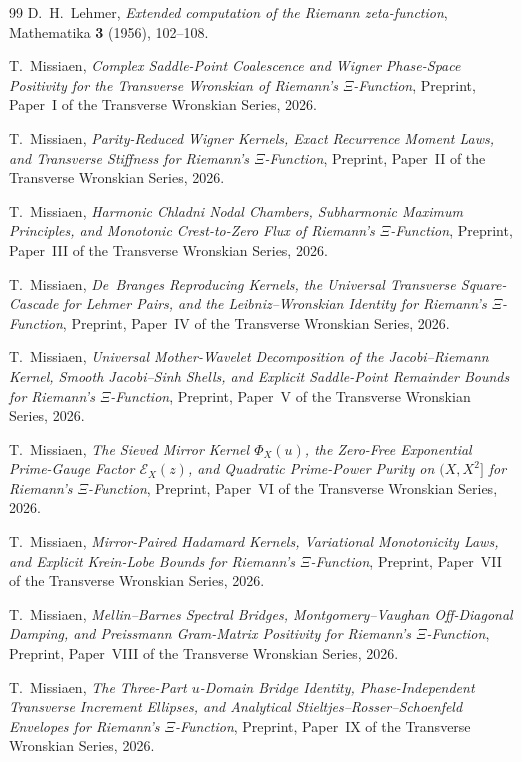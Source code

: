 \documentclass[11pt,reqno]{amsart}
\theoremstyle{definition}
\theoremstyle{remark}
\numberwithin{equation}{section}
\begin{document}
\begin{thebibliography}{99}
D.~H.~Lehmer,
\emph{Extended computation of the Riemann zeta-function},
Mathematika \textbf{3} (1956), 102--108.

T.~Missiaen,
\emph{Complex Saddle-Point Coalescence and Wigner Phase-Space Positivity for the Transverse Wronskian of Riemann's $\Xi$-Function},
Preprint, Paper~I of the Transverse Wronskian Series, 2026.

T.~Missiaen,
\emph{Parity-Reduced Wigner Kernels, Exact Recurrence Moment Laws, and Transverse Stiffness for Riemann's $\Xi$-Function},
Preprint, Paper~II of the Transverse Wronskian Series, 2026.

T.~Missiaen,
\emph{Harmonic Chladni Nodal Chambers, Subharmonic Maximum Principles, and Monotonic Crest-to-Zero Flux of Riemann's $\Xi$-Function},
Preprint, Paper~III of the Transverse Wronskian Series, 2026.

T.~Missiaen,
\emph{De~Branges Reproducing Kernels, the Universal Transverse Square-Cascade for Lehmer Pairs, and the Leibniz--Wronskian Identity for Riemann's $\Xi$-Function},
Preprint, Paper~IV of the Transverse Wronskian Series, 2026.

T.~Missiaen,
\emph{Universal Mother-Wavelet Decomposition of the Jacobi--Riemann Kernel, Smooth Jacobi--Sinh Shells, and Explicit Saddle-Point Remainder Bounds for Riemann's $\Xi$-Function},
Preprint, Paper~V of the Transverse Wronskian Series, 2026.

T.~Missiaen,
\emph{The Sieved Mirror Kernel $\Phi_X(u)$, the Zero-Free Exponential Prime-Gauge Factor $\mathcal{E}_X(z)$, and Quadratic Prime-Power Purity on $(X, X^2]$ for Riemann's $\Xi$-Function},
Preprint, Paper~VI of the Transverse Wronskian Series, 2026.

T.~Missiaen,
\emph{Mirror-Paired Hadamard Kernels, Variational Monotonicity Laws, and Explicit Krein-Lobe Bounds for Riemann's $\Xi$-Function},
Preprint, Paper~VII of the Transverse Wronskian Series, 2026.

T.~Missiaen,
\emph{Mellin--Barnes Spectral Bridges, Montgomery--Vaughan Off-Diagonal Damping, and Preissmann Gram-Matrix Positivity for Riemann's $\Xi$-Function},
Preprint, Paper~VIII of the Transverse Wronskian Series, 2026.

T.~Missiaen,
\emph{The Three-Part $u$-Domain Bridge Identity, Phase-Independent Transverse Increment Ellipses, and Analytical Stieltjes--Rosser--Schoenfeld Envelopes for Riemann's $\Xi$-Function},
Preprint, Paper~IX of the Transverse Wronskian Series, 2026.


\end{thebibliography}
\end{document}
